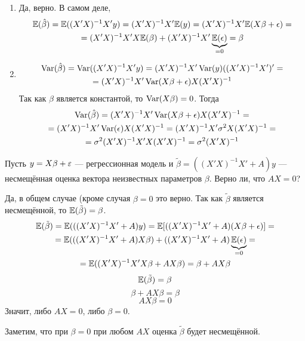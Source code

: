 \begin{solution}
\begin{enumerate}
\item
Да, верно. В самом деле, 
\begin{multline*}
\mathbb{E}(\hat\beta)=\mathbb{E}((X'X)^{-1}X'y)=(X'X)^{-1}X'\mathbb{E}(y)=(X'X)^{-1}X'\mathbb{E}(X\beta+\epsilon)=\\
=(X'X)^{-1}X'X\mathbb{E}(\beta)+(X'X)^{-1}X'\underbrace{\mathbb{E}(\epsilon)}_{=0}=\beta
\end{multline*}


\item
\begin{multline*}
\operatorname{Var}(\hat\beta)=\operatorname{Var}((X'X)^{-1}X'y)=(X'X)^{-1}X'\operatorname{Var}(y)((X'X)^{-1}X')'=\\
=(X'X)^{-1}X'\operatorname{Var}(X\beta+\epsilon)X(X'X)^{-1}
\end{multline*}
Так как $\beta$ является константой, то $\operatorname{Var}(X\beta)=0$. Тогда 
\begin{multline*}
\operatorname{Var}(\hat\beta)=(X'X)^{-1}X'\operatorname{Var}(X\beta+\epsilon)X(X'X)^{-1}=\\=(X'X)^{-1}X'\operatorname{Var}(\epsilon)X(X'X)^{-1}=
(X'X)^{-1}X'\sigma^2X(X'X)^{-1}=\\=\sigma^2(X'X)^{-1}X'X(X'X)^{-1}=\sigma^2(X'X)^{-1}
\end{multline*}
\end{enumerate}

\end{solution}

\begin{problem} 
Пусть $y = X\beta + \varepsilon$ --- регрессионная модель и $\tilde{\beta} = ((X'X)^{-1}X'+ A)y$ --- несмещённая оценка вектора неизвестных параметров $\beta$. Верно ли, что $AX=0$?
\end{problem}

\begin{solution}
Да, в общем случае (кроме случая $\beta=0$ это верно. Так как $\tilde\beta$ является несмещённой, то $\mathbb{E}(\tilde\beta)=\beta$.
\begin{multline*}
\mathbb{E}(\tilde\beta)=\mathbb{E}(((X'X)^{-1}X'+A)y)=\mathbb{E}[((X'X)^{-1}X'+A)(X\beta+\epsilon)]=\\=
\mathbb{E}(((X'X)^{-1}X'+A)X\beta)+((X'X)^{-1}X'+A)\underbrace{\mathbb{E}(\epsilon)}_{=0}=\\
=\mathbb{E}((X'X)^{-1}X'X\beta+AX\beta)=\beta+AX\beta
\end{multline*}
\[\mathbb{E}(\tilde\beta)=\beta\]
\[\beta+AX\beta=\beta\]
\[AX\beta=0\]
Значит, либо $AX=0$, либо $\beta=0$.

Заметим, что при $\beta=0$ при любом $AX$ оценка $\tilde\beta$ будет несмещённой.
\end{solution}




